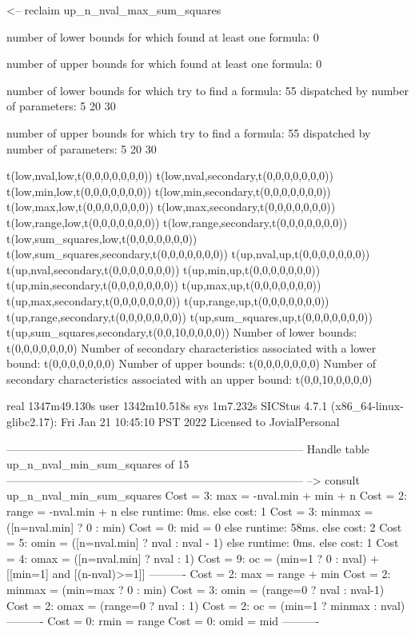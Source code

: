 <-- reclaim up_n_nval_max_sum_squares

number of lower bounds for which found at least one formula: 0

number of upper bounds for which found at least one formula: 0

number of lower bounds for which try to find a formula: 55
dispatched by number of parameters: 5  20  30

number of upper bounds for which try to find a formula: 55
dispatched by number of parameters: 5  20  30

t(low,nval,low,t(0,0,0,0,0,0,0))
t(low,nval,secondary,t(0,0,0,0,0,0,0))
t(low,min,low,t(0,0,0,0,0,0,0))
t(low,min,secondary,t(0,0,0,0,0,0,0))
t(low,max,low,t(0,0,0,0,0,0,0))
t(low,max,secondary,t(0,0,0,0,0,0,0))
t(low,range,low,t(0,0,0,0,0,0,0))
t(low,range,secondary,t(0,0,0,0,0,0,0))
t(low,sum_squares,low,t(0,0,0,0,0,0,0))
t(low,sum_squares,secondary,t(0,0,0,0,0,0,0))
t(up,nval,up,t(0,0,0,0,0,0,0))
t(up,nval,secondary,t(0,0,0,0,0,0,0))
t(up,min,up,t(0,0,0,0,0,0,0))
t(up,min,secondary,t(0,0,0,0,0,0,0))
t(up,max,up,t(0,0,0,0,0,0,0))
t(up,max,secondary,t(0,0,0,0,0,0,0))
t(up,range,up,t(0,0,0,0,0,0,0))
t(up,range,secondary,t(0,0,0,0,0,0,0))
t(up,sum_squares,up,t(0,0,0,0,0,0,0))
t(up,sum_squares,secondary,t(0,0,10,0,0,0,0))
Number of lower bounds:                                             t(0,0,0,0,0,0,0)
Number of secondary characteristics associated with a lower bound:  t(0,0,0,0,0,0,0)
Number of upper bounds:                                             t(0,0,0,0,0,0,0)
Number of secondary characteristics associated with an upper bound: t(0,0,10,0,0,0,0)

real	1347m49.130s
user	1342m10.518s
sys	1m7.232s
SICStus 4.7.1 (x86_64-linux-glibc2.17): Fri Jan 21 10:45:10 PST 2022
Licensed to JovialPersonal


--------------------------------------------------------------------------------
Handle table up_n_nval_min_sum_squares of 15
--------------------------------------------------------------------------------
--> consult up_n_nval_min_sum_squares
Cost =  3:  max    = -nval.min + min + n
Cost =  2:  range  = -nval.min + n
else runtime: 0ms. else cost: 1
Cost =  3:  minmax = ([n=nval.min] ? 0 : min) %
Cost =  0:  mid    = 0
else runtime: 58ms. else cost: 2
Cost =  5:  omin   = ([n=nval.min] ? nval : nval - 1) %
else runtime: 0ms. else cost: 1
Cost =  4:  omax   = ([n=nval.min] ? nval : 1) %
Cost =  9:  oc     = (min=1 ? 0 : nval) + [[min=1] and [(n-nval)>=1]] %
----------
Cost =  2:  max    = range + min
Cost =  2:  minmax = (min=max ? 0 : min)
Cost =  3:  omin   = (range=0 ? nval : nval-1)
Cost =  2:  omax   = (range=0 ? nval : 1)
Cost =  2:  oc     = (min=1 ? minmax : nval)
----------
Cost =  0:  rmin   = range
Cost =  0:  omid   = mid
----------

